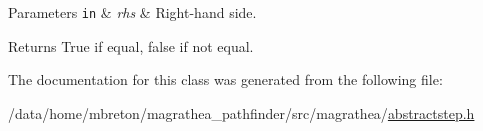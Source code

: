 \begin{DoxyParams}[1]{Parameters}
\mbox{\tt in}  & {\em rhs} & Right-\/hand side. \\
\hline
\end{DoxyParams}
\begin{DoxyReturn}{Returns}
True if equal, false if not equal. 
\end{DoxyReturn}


The documentation for this class was generated from the following file\-:\begin{DoxyCompactItemize}
\item 
/data/home/mbreton/magrathea\-\_\-pathfinder/src/magrathea/\hyperlink{abstractstep_8h}{abstractstep.\-h}\end{DoxyCompactItemize}
